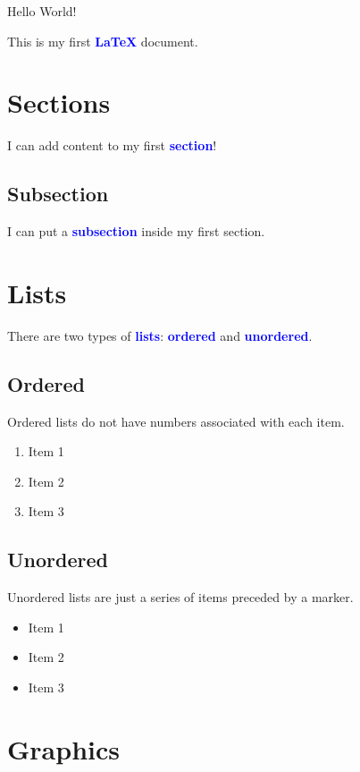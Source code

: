 \documentclass{article}
\newcommand{\kw}[1]{\textcolor{blue}{\textbf{#1}}}
\begin{document}
Hello World!

This is my first \kw{LaTeX} document.

\section{Sections}

I can add content to my first \kw{section}!

\subsection{Subsection}

I can put a \kw{subsection} inside my first section.

\section{Lists}

There are two types of \kw{lists}: \kw{ordered} and \kw{unordered}.

\subsection{Ordered}

Ordered lists do not have numbers associated with each item.

\begin{enumerate}
  \item Item 1
  \item Item 2
  \item Item 3
\end{enumerate}

\subsection{Unordered}

Unordered lists are just a series of items preceded by a marker.

\begin{itemize}
  \item Item 1
  \item Item 2
  \item Item 3
\end{itemize}

\section{Graphics}
\end{document}
